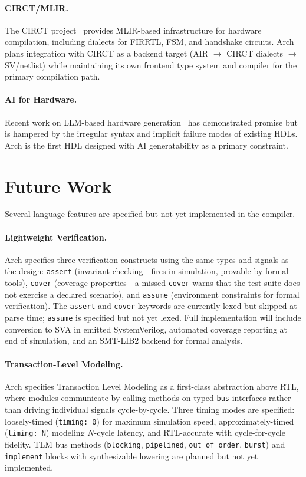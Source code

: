 \documentclass[11pt,twocolumn]{article}
\begin{document}
\paragraph{CIRCT/MLIR.}
The CIRCT project~\cite{circt} provides MLIR-based infrastructure for hardware compilation, including dialects for FIRRTL, FSM, and handshake circuits. Arch plans integration with CIRCT as a backend target (AIR $\to$ CIRCT dialects $\to$ SV/netlist) while maintaining its own frontend type system and compiler for the primary compilation path.

\paragraph{AI for Hardware.}
Recent work on LLM-based hardware generation~\cite{thakur2023verigen,liu2023chipnemo,blocklove2023chip} has demonstrated promise but is hampered by the irregular syntax and implicit failure modes of existing HDLs. Arch is the first HDL designed with AI generatability as a primary constraint.

\section{Future Work}\label{sec:future}

Several language features are specified but not yet implemented in the compiler.

\paragraph{Lightweight Verification.}
Arch specifies three verification constructs using the same types and signals as the design: \texttt{assert} (invariant checking---fires in simulation, provable by formal tools), \texttt{cover} (coverage properties---a missed \texttt{cover} warns that the test suite does not exercise a declared scenario), and \texttt{assume} (environment constraints for formal verification). The \texttt{assert} and \texttt{cover} keywords are currently lexed but skipped at parse time; \texttt{assume} is specified but not yet lexed. Full implementation will include conversion to SVA in emitted SystemVerilog, automated coverage reporting at end of simulation, and an SMT-LIB2 backend for formal analysis.

\paragraph{Transaction-Level Modeling.}
Arch specifies Transaction Level Modeling as a first-class abstraction above RTL, where modules communicate by calling methods on typed \texttt{bus} interfaces rather than driving individual signals cycle-by-cycle. Three timing modes are specified: loosely-timed (\texttt{timing: 0}) for maximum simulation speed, approximately-timed (\texttt{timing: N}) modeling $N$-cycle latency, and RTL-accurate with cycle-for-cycle fidelity. TLM bus methods (\texttt{blocking}, \texttt{pipelined}, \texttt{out\_of\_order}, \texttt{burst}) and \texttt{implement} blocks with synthesizable lowering are planned but not yet implemented.
\end{document}
